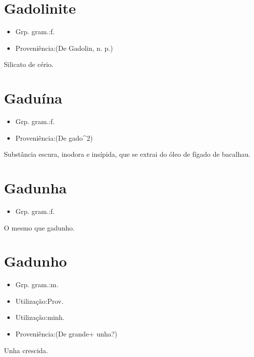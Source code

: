 \section{Gadolinite}
\begin{itemize}
\item {Grp. gram.:f.}
\end{itemize}
\begin{itemize}
\item {Proveniência:(De \textunderscore Gadolin\textunderscore , n. p.)}
\end{itemize}
Silicato de cério.
\section{Gaduína}
\begin{itemize}
\item {Grp. gram.:f.}
\end{itemize}
\begin{itemize}
\item {Proveniência:(De \textunderscore gado\textunderscore ^2)}
\end{itemize}
Substância escura, inodora e insípida, que se extrai do óleo de fígado de bacalhau.
\section{Gadunha}
\begin{itemize}
\item {Grp. gram.:f.}
\end{itemize}
O mesmo que \textunderscore gadunho\textunderscore .
\section{Gadunho}
\begin{itemize}
\item {Grp. gram.:m.}
\end{itemize}
\begin{itemize}
\item {Utilização:Prov.}
\end{itemize}
\begin{itemize}
\item {Utilização:minh.}
\end{itemize}
\begin{itemize}
\item {Proveniência:(De \textunderscore grande\textunderscore  + \textunderscore unha\textunderscore ?)}
\end{itemize}
Unha crescida.
